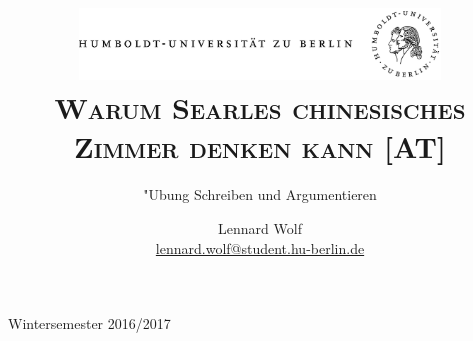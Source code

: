 \documentclass[a4paper, emulatestandardclasses, 12pt]{scrartcl}
\date{\vspace{-3ex}}
\begin{document}
\title{\vspace{5ex}
	\includegraphics*[width=0.72\textwidth]{images/hu_logo.png}\\
	\vspace{30pt}
	\scshape\LARGE{Warum Searles chinesisches\\Zimmer denken kann [AT]}}
	
	\subtitle{\vspace{20pt}"Ubung Schreiben und Argumentieren\\
          }

\author{\vspace{-4pt}Lennard Wolf\\
        \small{\href{mailto:lennard.wolf@student.hu-berlin.de}{lennard.wolf@student.hu-berlin.de}}}      

\maketitle

\vspace{\fill}

\begin{minipage}[b]{\textwidth}
    \centering
    \onehalfspacing
    \large   
    Wintersemester 2016/2017

    \vspace{-20mm} 
\end{minipage}%
\thispagestyle{empty}
\newpage
\clearpage
\setcounter{page}{1}
\end{document}
